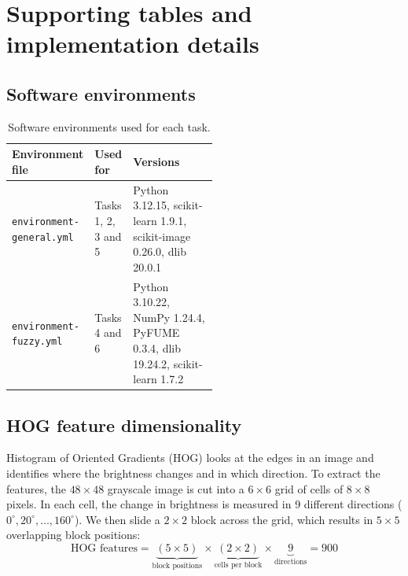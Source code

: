 \section{Supporting tables and implementation details}
\label{app:tables}

\FloatBarrier
\subsection{Software environments}
\label{app:env}
\begin{table}[H]\centering\small
\begin{tabular}{@{}llp{0.52\linewidth}@{}}\toprule
Environment file & Used for & Versions \\\midrule
\texttt{environment-general.yml} & Tasks 1, 2, 3 and 5 & Python 3.12.15, scikit-learn 1.9.1, scikit-image 0.26.0, dlib 20.0.1 \\
\texttt{environment-fuzzy.yml} & Tasks 4 and 6 & Python 3.10.22, NumPy 1.24.4, PyFUME 0.3.4, dlib 19.24.2, scikit-learn 1.7.2 \\
\bottomrule\end{tabular}
\caption{Software environments used for each task.}
\label{tab:environments}
\end{table}

\FloatBarrier
\subsection{HOG feature dimensionality}
\label{app:hog}
Histogram of Oriented Gradients (HOG) looks at the edges in an image and identifies where the brightness changes and in which direction. To extract the features, the $48\times48$ grayscale image is cut into a $6\times6$ grid of cells of $8\times8$ pixels. In each cell, the change in brightness is measured in 9 different directions ($0^\circ, 20^\circ, \dots, 160^\circ$). We then slide a $2\times2$ block across the grid, which results in $5\times5$ overlapping block positions:
\begin{equation*}
\text{HOG features}
= \underbrace{(5 \times 5)}_{\text{block positions}}
\times \underbrace{(2 \times 2)}_{\text{cells per block}}
\times \underbrace{9}_{\text{directions}}
= 900
\end{equation*}

\FloatBarrier

